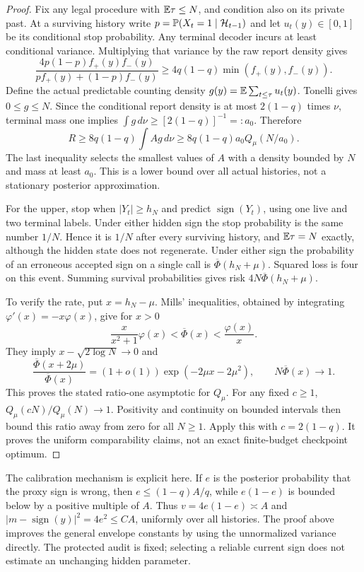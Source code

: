 \begin{proof}
Fix any legal procedure with $\mathbb E\tau\le N$, and condition also on its private past. At a surviving history write $p=\mathbb P(X_t=1\mid\mathcal H_{t-1})$ and let $u_t(y)\in[0,1]$ be its conditional stop probability. Any terminal decoder incurs at least conditional variance. Multiplying that variance by the raw report density gives
\[
 \frac{4p(1-p)f_+(y)f_-(y)}{pf_+(y)+(1-p)f_-(y)}
 \ge4q(1-q)\min(f_+(y),f_-(y)).
\]
Define the actual predictable counting density
$g(y)=\mathbb E\sum_{t\le\tau}u_t(y)$. Tonelli gives $0\le g\le N$. Since the conditional report density is at most $2(1-q)$ times $\nu$, terminal mass one implies
$\int g\,d\nu\ge[2(1-q)]^{-1}=:a_0$. Therefore
\[
 R\ge8q(1-q)\int A g\,d\nu
 \ge8q(1-q)a_0 Q_\mu(N/a_0).
\]
The last inequality selects the smallest values of $A$ with a density bounded by $N$ and mass at least $a_0$. This is a lower bound over all actual histories, not a stationary posterior approximation.

For the upper, stop when $|Y_t|\ge h_N$ and predict $\operatorname{sign}(Y_t)$, using one live and two terminal labels. Under either hidden sign the stop probability is the same number $1/N$. Hence it is $1/N$ after every surviving history, and $\mathbb E\tau=N$ exactly, although the hidden state does not regenerate. Under either sign the probability of an erroneous accepted sign on a single call is $\overline\Phi(h_N+\mu)$. Squared loss is four on this event. Summing survival probabilities gives risk $4N\overline\Phi(h_N+\mu)$.

To verify the rate, put $x=h_N-\mu$. Mills' inequalities, obtained by integrating $\varphi'(x)=-x\varphi(x)$, give for $x>0$
\[
 \frac{x}{x^2+1}\varphi(x)<\overline\Phi(x)<\frac{\varphi(x)}x.
\]
They imply $x-\sqrt{2\log N}\to0$ and
\[
 \frac{\overline\Phi(x+2\mu)}{\overline\Phi(x)}
 =(1+o(1))\exp(-2\mu x-2\mu^2),\qquad
 N\overline\Phi(x)\to1.
\]
This proves the stated ratio-one asymptotic for $Q_\mu$. For any fixed $c\ge1$, $Q_\mu(cN)/Q_\mu(N)\to1$. Positivity and continuity on bounded intervals then bound this ratio away from zero for all $N\ge1$. Apply this with $c=2(1-q)$. It proves the uniform comparability claims, not an exact finite-budget checkpoint optimum.
\end{proof}

The calibration mechanism is explicit here. If $e$ is the posterior probability that the proxy sign is wrong, then $e\le(1-q)A/q$, while $e(1-e)$ is bounded below by a positive multiple of $A$. Thus $v=4e(1-e)\asymp A$ and $|m-\operatorname{sign}(y)|^2=4e^2\le C A$, uniformly over all histories. The proof above improves the general envelope constants by using the unnormalized variance directly. The protected audit is fixed; selecting a reliable current sign does not estimate an unchanging hidden parameter.

